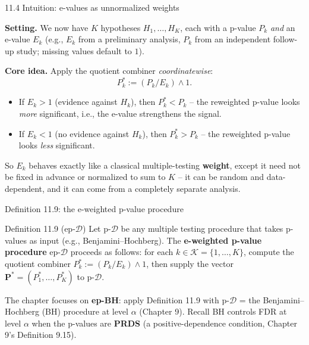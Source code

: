 \documentclass[aspectratio=169,10pt]{beamer}
\newcommand{\1}{\mathbb{1}}
\begin{document}
\begin{frame}[allowframebreaks]{11.4 Intuition: e-values as unnormalized weights}

\textbf{Setting.} We now have $K$ hypotheses $H_1,\dots,H_K$, each with a p-value $P_k$ \emph{and} an e-value $E_k$ (e.g., $E_k$ from a preliminary analysis, $P_k$ from an independent follow-up study; missing values default to $1$).

\textbf{Core idea.} Apply the quotient combiner \emph{coordinatewise}:
\[
P_k^* := (P_k/E_k)\wedge 1.
\]
\begin{itemize}
\item If $E_k > 1$ (evidence against $H_k$), then $P_k^* < P_k$ -- the reweighted p-value looks \emph{more} significant, i.e., the e-value strengthens the signal.
\item If $E_k < 1$ (no evidence against $H_k$), then $P_k^* > P_k$ -- the reweighted p-value looks \emph{less} significant.
\end{itemize}
So $E_k$ behaves exactly like a classical multiple-testing \textbf{weight}, except it need not be fixed in advance or normalized to sum to $K$ -- it can be random and data-dependent, and it can come from a completely separate analysis.

\end{frame}

\begin{frame}[allowframebreaks]{Definition 11.9: the e-weighted p-value procedure}

\begin{block}{Definition 11.9 (ep-$\mathcal D$)}
Let p-$\mathcal D$ be any multiple testing procedure that takes p-values as input (e.g., Benjamini--Hochberg). The \textbf{e-weighted p-value procedure} ep-$\mathcal D$ proceeds as follows: for each $k\in\mathcal K=\{1,\dots,K\}$, compute the quotient combiner $P_k^* := (P_k/E_k)\wedge 1$, then supply the vector $\mathbf P^* = (P_1^*,\dots,P_K^*)$ to p-$\mathcal D$.
\end{block}

The chapter focuses on \textbf{ep-BH}: apply Definition 11.9 with p-$\mathcal D$ = the Benjamini--Hochberg (BH) procedure at level $\alpha$ (Chapter 9). Recall BH controls FDR at level $\alpha$ when the p-values are \textbf{PRDS} (a positive-dependence condition, Chapter 9's Definition 9.15).

\end{frame}
\end{document}
